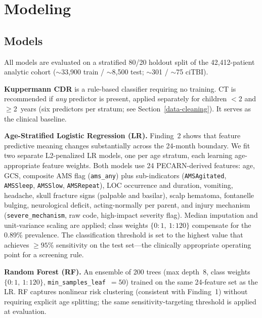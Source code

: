 \documentclass[10pt,letterpaper]{article}
\begin{document}
\section{Modeling}
\label{modeling}

\subsection{Models}
\label{model-descriptions}

All models are evaluated on a stratified 80/20 holdout split of the 42,412-patient analytic cohort
($\sim$33,900 train / $\sim$8,500 test; $\sim$301 / $\sim$75 ciTBI).

\textbf{Kuppermann CDR} is a rule-based classifier requiring no training.
CT is recommended if \emph{any} predictor is present, applied separately for children $<$2 and $\ge$2~years
(six predictors per stratum; see Section~\ref{data-cleaning}).
It serves as the clinical baseline.

\textbf{Age-Stratified Logistic Regression (LR).}
Finding~2 shows that feature predictive meaning changes substantially across the 24-month boundary.
We fit two separate L2-penalized LR models, one per age stratum, each learning age-appropriate
feature weights.
Both models use 24 PECARN-derived features: age, GCS, composite AMS flag (\texttt{ams\_any}) plus
sub-indicators (\texttt{AMSAgitated}, \texttt{AMSSleep}, \texttt{AMSSlow}, \texttt{AMSRepeat}),
LOC occurrence and duration, vomiting, headache, skull fracture signs (palpable and basilar),
scalp hematoma, fontanelle bulging, neurological deficit, acting-normally per parent, and
injury mechanism (\texttt{severe\_mechanism}, raw code, high-impact severity flag).
Median imputation and unit-variance scaling are applied; class weights $\{0\!:\!1,\ 1\!:\!120\}$
compensate for the 0.89\% prevalence.
The classification threshold is set to the highest value that achieves $\ge 95\%$ sensitivity
on the test set---the clinically appropriate operating point for a screening rule.

\textbf{Random Forest (RF).}
An ensemble of 200 trees (max depth~8, class weights $\{0\!:\!1,\ 1\!:\!120\}$,
\texttt{min\_samples\_leaf}~$=50$) trained on the same 24-feature set as the LR.
RF captures nonlinear risk clustering (consistent with Finding~1) without requiring explicit
age splitting; the same sensitivity-targeting threshold is applied at evaluation.
\end{document}
